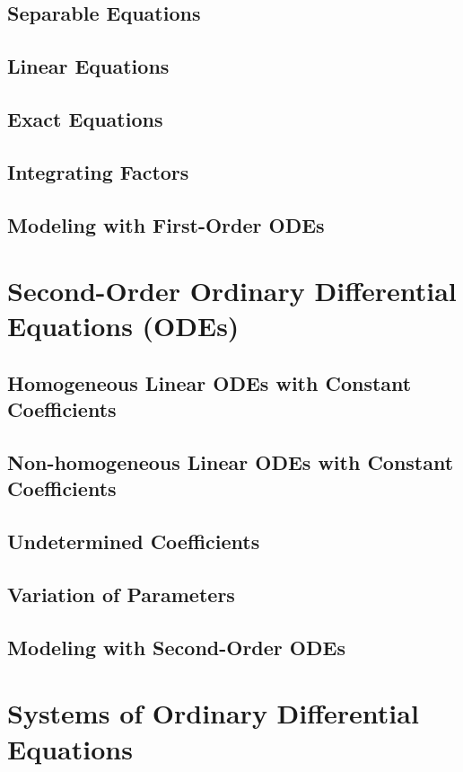 \documentclass[11pt]{article}
\begin{document}
		\subsection{Separable Equations}
			\lipsum[1]
		\subsection{Linear Equations}
			\lipsum[1]
		\subsection{Exact Equations}
			\lipsum[1]
		\subsection{Integrating Factors}
			\lipsum[1]
		\subsection{Modeling with First-Order ODEs}
			\lipsum[1]
	\section{Second-Order Ordinary Differential Equations (ODEs)}
		\lipsum[1]
		\subsection{Homogeneous Linear ODEs with Constant Coefficients}
			\lipsum[1]
		\subsection{Non-homogeneous Linear ODEs with Constant Coefficients}
			\lipsum[1]
		\subsection{Undetermined Coefficients}
			\lipsum[1]
		\subsection{Variation of Parameters}
			\lipsum[1]
		\subsection{Modeling with Second-Order ODEs}
			\lipsum[1]
	\section{Systems of Ordinary Differential Equations}
		\lipsum[1]
\end{document}

